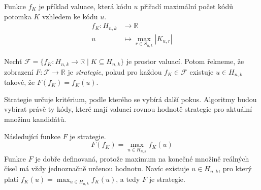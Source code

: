 
\begin{prikl}\label{prjednokrokfce}
    Funkce $f_K$ je příklad valuace, která kódu $u$ přiřadí maximální počet kódů potomka $K$ vzhledem ke kódu $u$.
    \begin{align*}
        f_K \colon H_{n,k} &\to \mathbb{R} \\
        u &\mapsto \max_{r\in S_{n,k}} |K_{u,r}|
    \end{align*}
\end{prikl}


\begin{definice}[Strategie]
    Nechť $\mathcal{F} = \{f_K\colon H_{n,k} \to \mathbb{R} \mid K \subseteq H_{n,k}\}$ je prostor valuací. Potom řekneme, že zobrazení $F \colon \mathcal{F} \to \mathbb{R}$ je \emph{strategie}, pokud pro každou $f_K \in \mathcal{F}$ existuje $u\in H_{n,k}$ takové, že $F(f_K) = f_K(u)$.
\end{definice}
Strategie určuje kritérium, podle kterého se vybírá další pokus. Algoritmy budou vybírat právě ty kódy, které mají valuaci rovnou hodnotě strategie pro aktuální množinu kandidátů. 


\begin{prikl}\label{prstrategie}
    Následující funkce $F$ je strategie.
    \[F(f_K) =  \max_{u\in H_{n,k}} f_K(u)\]
    Funkce $F$ je dobře definovaná, protože maximum na konečné množině reálných čísel má vždy jednoznačně určenou hodnotu. Navíc existuje $u\in H_{n,k}$, pro který platí $f_K(u) = \max_{u\in H_{n,k}} f_K(u)$, a tedy $F$ je strategie.
\end{prikl}

